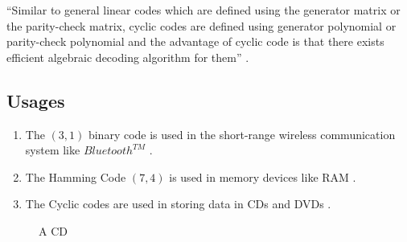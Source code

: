 \vspace{7mm}
``Similar to general linear codes which are defined using the generator matrix or the parity-check matrix, cyclic codes are defined using generator polynomial or parity-check polynomial and the advantage of cyclic code is that there exists efficient algebraic decoding algorithm for them'' \cite{coding}.

\clearpage
\subsection{Usages}
\begin{enumerate}
\item The \((3,1)\) binary code is used in the short-range wireless communication system like \(Bluetooth^{TM}\) \cite{wireless}.
\item The Hamming Code \((7,4)\) is used in memory devices like RAM \cite{coding}.

  \item The Cyclic codes are used in storing data in CDs and DVDs \cite{coding}.
  \end{enumerate}
  \vspace{9mm}

  \begin{figure}[h]
    \centering
    \caption{\footnotesize A CD}
    \end{figure}